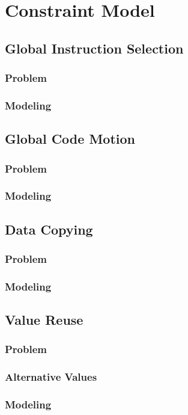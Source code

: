 \chapter{Constraint Model}

\section{Global Instruction Selection}
\subsection{Problem}
\subsection{Modeling}

\section{Global Code Motion}
\subsection{Problem}
\subsection{Modeling}

\section{Data Copying}
\subsection{Problem}
\subsection{Modeling}

\section{Value Reuse}
\subsection{Problem}
\subsection{Alternative Values}
\subsection{Modeling}
